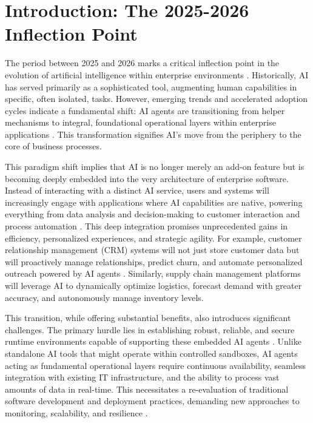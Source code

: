 \section{Introduction: The 2025-2026 Inflection Point}

The period between 2025 and 2026 marks a critical inflection point in the evolution of artificial intelligence within enterprise environments \cite{Reger2026}. Historically, AI has served primarily as a sophisticated tool, augmenting human capabilities in specific, often isolated, tasks. However, emerging trends and accelerated adoption cycles indicate a fundamental shift: AI agents are transitioning from helper mechanisms to integral, foundational operational layers within enterprise applications \cite{Gartner2025}. This transformation signifies AI's move from the periphery to the core of business processes.

This paradigm shift implies that AI is no longer merely an add-on feature but is becoming deeply embedded into the very architecture of enterprise software. Instead of interacting with a distinct AI service, users and systems will increasingly engage with applications where AI capabilities are native, powering everything from data analysis and decision-making to customer interaction and process automation \cite{Reger2026}. This deep integration promises unprecedented gains in efficiency, personalized experiences, and strategic agility. For example, customer relationship management (CRM) systems will not just store customer data but will proactively manage relationships, predict churn, and automate personalized outreach powered by AI agents \cite{Gartner2025}. Similarly, supply chain management platforms will leverage AI to dynamically optimize logistics, forecast demand with greater accuracy, and autonomously manage inventory levels.

This transition, while offering substantial benefits, also introduces significant challenges. The primary hurdle lies in establishing robust, reliable, and secure runtime environments capable of supporting these embedded AI agents \cite{Reger2026}. Unlike standalone AI tools that might operate within controlled sandboxes, AI agents acting as fundamental operational layers require continuous availability, seamless integration with existing IT infrastructure, and the ability to process vast amounts of data in real-time. This necessitates a re-evaluation of traditional software development and deployment practices, demanding new approaches to monitoring, scalability, and resilience \cite{Gartner2025}.

